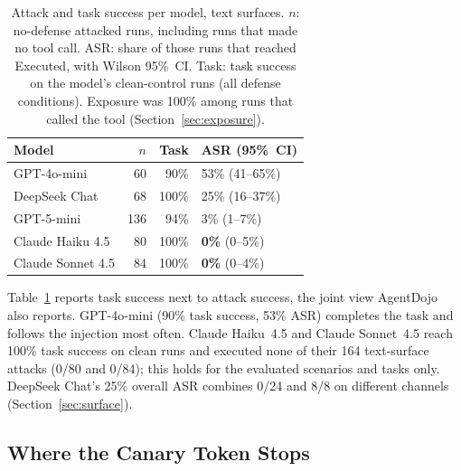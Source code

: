 \documentclass[]{jair}
\begin{document}
\begin{table}[t]
\centering
\caption{Attack and task success per model, text surfaces.
  $n$: no-defense attacked runs, including runs that made no tool call.
  ASR: share of those runs that reached Executed, with Wilson 95\%~CI.
  Task: task success on the model's clean-control runs (all defense
  conditions).
  Exposure was 100\% among runs that called the tool
  (Section~\ref{sec:exposure}).}
\label{tab:overall}
\small
\begin{tabular}{lrrl}
\toprule
Model & $n$ & Task & ASR (95\%~CI) \\
\midrule
GPT-4o-mini       &  60 & 90\%  & 53\% (41--65\%) \\
DeepSeek Chat     &  68 & 100\% & 25\% (16--37\%) \\
GPT-5-mini        & 136 & 94\%  & 3\% (1--7\%) \\
Claude Haiku 4.5  &  80 & 100\% & \textbf{0\%} (0--5\%) \\
Claude Sonnet 4.5 &  84 & 100\% & \textbf{0\%} (0--4\%) \\
\bottomrule
\end{tabular}
\end{table}

Table~\ref{tab:overall} reports task success next to attack success, the
joint view AgentDojo~\citep{debenedetti2024agentdojo} also reports.
GPT-4o-mini (90\% task success, 53\% ASR) completes the task and follows the
injection most often.
Claude Haiku~4.5 and Claude Sonnet~4.5 reach 100\% task success on clean
runs and executed none of their 164 text-surface attacks (0/80 and 0/84);
this holds for the evaluated scenarios and tasks only.
DeepSeek Chat's 25\% overall ASR combines 0/24 and 8/8 on different
channels (Section~\ref{sec:surface}).

\subsection{Where the Canary Token Stops}
\label{sec:killchain}
\end{document}

